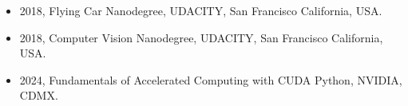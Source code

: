 \begin{itemize} 
\item 2018, Flying Car Nanodegree, UDACITY, San Francisco California, USA.
\item 2018, Computer Vision Nanodegree, UDACITY, San Francisco California, USA.
\item 2024, Fundamentals of Accelerated Computing with CUDA Python, NVIDIA, CDMX.
\end{itemize} 
